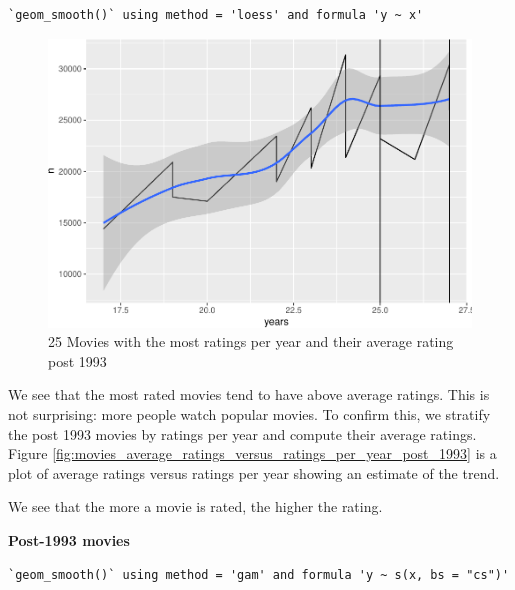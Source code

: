\documentclass[
]{article}
\begin{document}
\begin{verbatim}
`geom_smooth()` using method = 'loess' and formula 'y ~ x'
\end{verbatim}

\begin{figure}
\centering
\includegraphics{figures/md_2-1.pdf}
\caption{25 Movies with the most ratings per year and their average
rating post
1993\label{fig:25_movies_avg_and_most_ratings_per_year_post_1993}}
\end{figure}

\newpage

We see that the most rated movies tend to have above average ratings.
This is not surprising: more people watch popular movies. To confirm
this, we stratify the post 1993 movies by ratings per year and compute
their average ratings. Figure
\ref{fig:movies_average_ratings_versus_ratings_per_year_post_1993} is a
plot of average ratings versus ratings per year showing an estimate of
the trend.

We see that the more a movie is rated, the higher the rating.

\textbf{Post-1993 movies}

\begin{verbatim}
`geom_smooth()` using method = 'gam' and formula 'y ~ s(x, bs = "cs")'
\end{verbatim}
\end{document}
